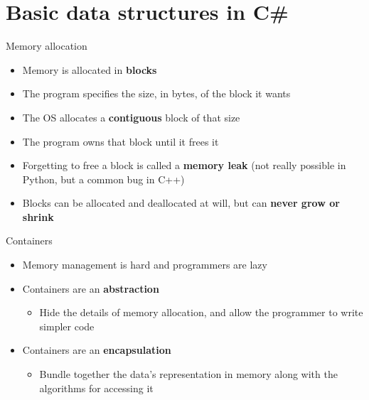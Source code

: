 \part{Basic data structures in C\#}
\frame{\partpage}

\begin{frame}{Memory allocation}
	\begin{itemize}
		\pause\item Memory is allocated in \textbf{blocks}
		\pause\item The program specifies the size, in bytes, of the block it wants
		\pause\item The OS allocates a \textbf{contiguous} block of that size
		\pause\item The program owns that block until it frees it
		\pause\item Forgetting to free a block is called a \textbf{memory leak}
			(not really possible in Python, but a common bug in C++)
		\pause\item Blocks can be allocated and deallocated at will, but can \textbf{never grow or shrink}
	\end{itemize}
\end{frame}

\begin{frame}{Containers}
	\begin{itemize}
		\pause\item Memory management is hard and programmers are lazy
		\pause\item Containers are an \textbf{abstraction}
			\begin{itemize}
				\pause\item Hide the details of memory allocation, and allow the programmer to write simpler code
			\end{itemize}
		\pause\item Containers are an \textbf{encapsulation}
			\begin{itemize}
				\pause\item Bundle together the data's representation in memory along with the algorithms for accessing it
			\end{itemize}
	\end{itemize}
\end{frame}

